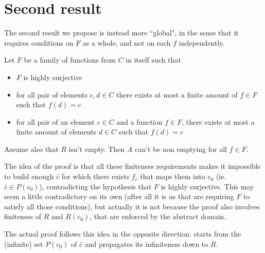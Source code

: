 \section{Second result}
The second result we propose is instead more ``global", in the sense that it requires conditions on $F$ as a whole, and not on each $f$ independently.

\begin{theorem}\label{ch4:th:non-empt-res-global}
	Let $F$ be a family of functions from $C$ in itself such that
	\begin{itemize}
		\item $F$ is highly surjective
		\item for all pair of elements $c, d \in C$ there exists at most a finite amount of $f \in F$ such that $f(d) = c$
		\item for all pair of an element $c \in C$ and a function $f \in F$, there exists at most a finite amount of elements $d \in C$ such that $f(d) = c$
	\end{itemize}
	Assume also that $R$ isn't empty. Then $A$ can't be non emptying for all $f \in F$.
\end{theorem}

The idea of the proof is that all these finiteness requirements makes it impossible to build enough $\bar{c}$ for which there exists $f_{\bar{c}}$ that maps them into $c_0$ (ie. $\bar{c} \in P(c_0)$), contradicting the hypothesis that $F$ is highly surjective. This may seem a little contradictory on its own (after all it is us that are requiring $F$ to satisfy all those conditions), but actually it is not because the proof also involves finiteness of $R$ and $R(c_0)$, that are enforced by the abstract domain.

The actual proof follows this idea in the opposite direction: starts from the (infinite) set $P(c_0)$ of $\bar{c}$ and propagates its infiniteness down to $R$.

